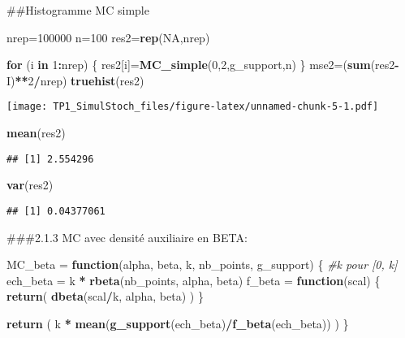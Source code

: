 \documentclass[]{article}
\newenvironment{Shaded}{\begin{snugshade}}{\end{snugshade}}
\newcommand{\CommentTok}[1]{\textcolor[rgb]{0.56,0.35,0.01}{\textit{#1}}}
\newcommand{\ControlFlowTok}[1]{\textcolor[rgb]{0.13,0.29,0.53}{\textbf{#1}}}
\newcommand{\DecValTok}[1]{\textcolor[rgb]{0.00,0.00,0.81}{#1}}
\newcommand{\KeywordTok}[1]{\textcolor[rgb]{0.13,0.29,0.53}{\textbf{#1}}}
\newcommand{\NormalTok}[1]{#1}
\newcommand{\OperatorTok}[1]{\textcolor[rgb]{0.81,0.36,0.00}{\textbf{#1}}}
\newcommand{\OtherTok}[1]{\textcolor[rgb]{0.56,0.35,0.01}{#1}}
\newcommand{\StringTok}[1]{\textcolor[rgb]{0.31,0.60,0.02}{#1}}
\begin{document}
\#\#Histogramme MC simple

\begin{Shaded}
\begin{Highlighting}[]
\NormalTok{nrep=}\DecValTok{100000}
\NormalTok{n=}\DecValTok{100}
\NormalTok{res2=}\KeywordTok{rep}\NormalTok{(}\OtherTok{NA}\NormalTok{,nrep)}

\ControlFlowTok{for}\NormalTok{ (i }\ControlFlowTok{in} \DecValTok{1}\OperatorTok{:}\NormalTok{nrep) \{}
\NormalTok{  res2[i]=}\KeywordTok{MC_simple}\NormalTok{(}\DecValTok{0}\NormalTok{,}\DecValTok{2}\NormalTok{,g_support,n)}
\NormalTok{\}}
\NormalTok{mse2=(}\KeywordTok{sum}\NormalTok{(res2}\OperatorTok{-}\NormalTok{I)}\OperatorTok{**}\DecValTok{2}\OperatorTok{/}\NormalTok{nrep)}
\KeywordTok{truehist}\NormalTok{(res2)}
\end{Highlighting}
\end{Shaded}

\texttt{[image: TP1\_SimulStoch\_files/figure-latex/unnamed-chunk-5-1.pdf]}

\begin{Shaded}
\begin{Highlighting}[]
\KeywordTok{mean}\NormalTok{(res2)}
\end{Highlighting}
\end{Shaded}

\begin{verbatim}
## [1] 2.554296
\end{verbatim}

\begin{Shaded}
\begin{Highlighting}[]
\KeywordTok{var}\NormalTok{(res2)}
\end{Highlighting}
\end{Shaded}

\begin{verbatim}
## [1] 0.04377061
\end{verbatim}

\#\#\#2.1.3 MC avec densité auxiliaire en BETA:

\begin{Shaded}
\begin{Highlighting}[]
\NormalTok{MC_beta =}\StringTok{ }\ControlFlowTok{function}\NormalTok{(alpha, beta, k, nb_points, g_support)}
\NormalTok{\{ }\CommentTok{#k pour [0, k]}
\NormalTok{  ech_beta =}\StringTok{ }\NormalTok{k }\OperatorTok{*}\StringTok{ }\KeywordTok{rbeta}\NormalTok{(nb_points, alpha, beta)}
\NormalTok{  f_beta =}\StringTok{ }\ControlFlowTok{function}\NormalTok{(scal) \{ }\KeywordTok{return}\NormalTok{( }\KeywordTok{dbeta}\NormalTok{(scal}\OperatorTok{/}\NormalTok{k, alpha, beta) ) \}}
  
  \KeywordTok{return}\NormalTok{ ( k }\OperatorTok{*}\StringTok{ }\KeywordTok{mean}\NormalTok{(}\KeywordTok{g_support}\NormalTok{(ech_beta)}\OperatorTok{/}\KeywordTok{f_beta}\NormalTok{(ech_beta)) )}
\NormalTok{\}}
\end{Highlighting}
\end{Shaded}
\end{document}
